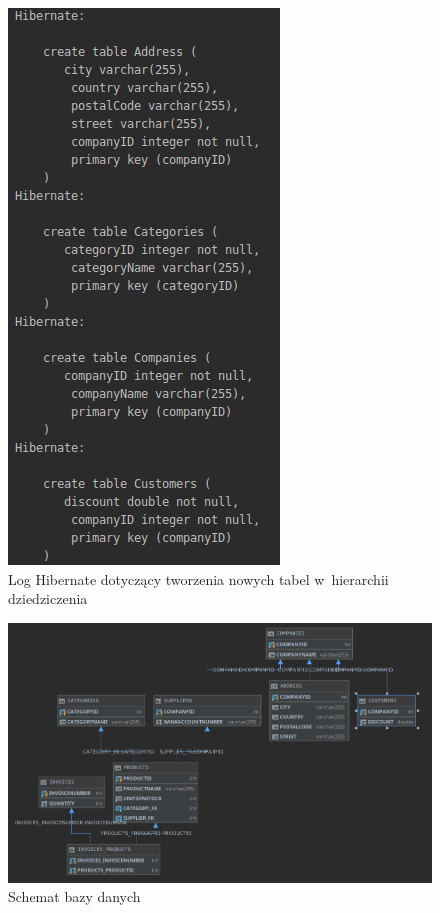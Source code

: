 \documentclass[12pt, a4paper]{mwart}
\begin{document}
\begin{figure}[ht]
  \centering
  \includegraphics[scale=0.5]{XI/11-5.png}
  \caption{Log Hibernate dotyczący tworzenia nowych tabel w~hierarchii dziedziczenia}
  \label{rys:11.5}
\end{figure}

\begin{figure}[ht]
  \centering
  \includegraphics[scale=0.45]{XI/11-6.png}
  \caption{Schemat bazy danych}
  \label{rys:11.6}
\end{figure}
\end{document}
